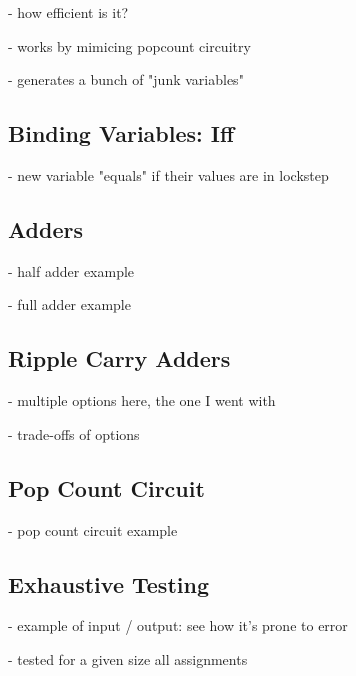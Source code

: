 - how efficient is it?

- works by mimicing popcount circuitry

- generates a bunch of "junk variables"

\subsection{Binding Variables: Iff}
- new variable "equals" if their values are in lockstep

\subsection{Adders}
- half adder example

- full adder example

\subsection{Ripple Carry Adders}
- multiple options here, the one I went with

- trade-offs of options

\subsection{Pop Count Circuit}
- pop count circuit example



\subsection{Exhaustive Testing}

- example of input / output: see how it's prone to error

- tested for a given size all assignments

